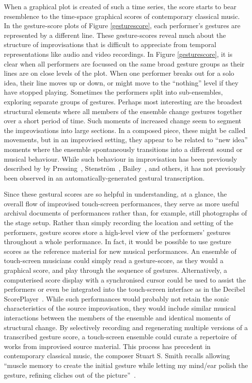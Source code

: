 \documentclass[graybox]{svmult}
\begin{document}
When a graphical plot is created of such a time series, the score
starts to bear resemblence to the time-space graphical scores of
contemporary classical music. In the gesture-score plots of Figure
\ref{gesturescore}, each performer's gestures are represented by a
different line. These gesture-scores reveal much about the
structure of improvisations that is difficult to appreciate from
temporal representations like audio and video recordings. In Figure
\ref{gesturescore}, it is clear when all performers are focussed on
the same broad gesture groups as their lines are on close levels of
the plot. When one performer breaks out for a solo idea, their line
moves up or down, or might move to the ``nothing'' level if they 
have stopped playing. Sometimes the performers split into
sub-ensembles, exploring separate groups of gestures. Perhaps most
interesting are the broadest structural elements where all members of
the ensemble change gestures together over a short period of time.
Such moments of increased change seem to segment the improvisations
into large sections. In a composed piece, these might be called
movements, but in an improvised setting, they appear to be related to
``new idea'' moments where the ensemble spontaneously transitions into
a different sound or musical behaviour. While such behaviour in
improvisation has been previously described by by
Pressing~\cite{Pressing:1988uo}, Stenstr\"om~\cite{Stenstrom:2009xy},
Bailey~\cite{Bailey:1993zl}, and others, it has not previously been
observed in an automatically-generated gestural transcription.

Since these gestural scores are so helpful in understanding, at a
glance, the overall flow of improvised touch-screen performances, they
serve as more useful archival documents of performances rather than, for
example, still photographs of the stage setup. Rather than simply
recording the location and setting of the performers, gesture scores
store a high-level view of the performers' gestures throughout a whole
performance. In fact, it would be possible to use gesture scores as
the reference material for new musical performances. An ensemble of
touch-screen musicians could simply read a gesture-score, as they
would a graphical score, and play through the sequence of gestures.
Alternatively, a computerised score display with a synchronised cursor
could be used to assist the performers or even be integrated into the
touch-screen interface as in the Decibel
ScorePlayer~\cite{Hope:2015lr}. While such performances would probably
not retain the sonic characteristics of the source improvisation, they
would include similar musical interactions between the members of the
ensemble and identical moments of structural change. By selectively
recording and regenerating multiple versions of a transcribed gesture
score, a touch-screen ensemble could curate a repertoire of works from
improvised source material. This process has precedent in contemporary
classical music, the composer Stuart S. Smith recalls allowing
``muscle memory to create the initial gesture while letting my
mind/ear polish the gesture, refining cliches out of the
picture''~\cite{Smith:1998ff}.
\end{document}
